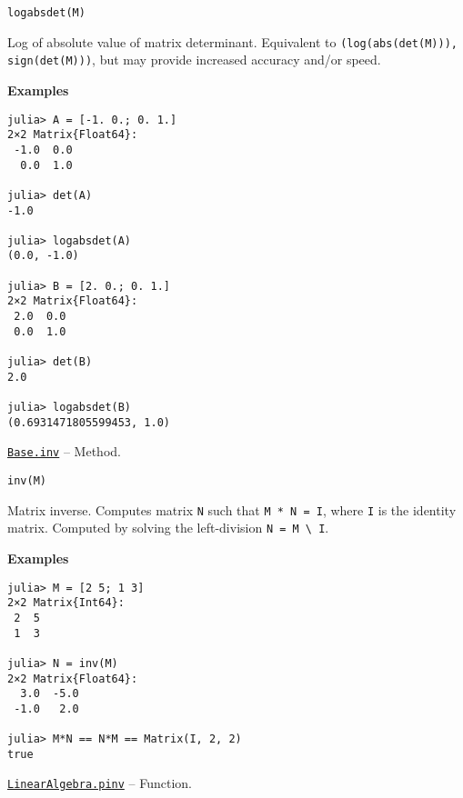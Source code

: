 \begin{adjustwidth}{2em}{0pt}


\begin{verbatim}
logabsdet(M)
\end{verbatim}

Log of absolute value of matrix determinant. Equivalent to \texttt{(log(abs(det(M))), sign(det(M)))}, but may provide increased accuracy and/or speed.

\textbf{Examples}


\begin{verbatim}
julia> A = [-1. 0.; 0. 1.]
2×2 Matrix{Float64}:
 -1.0  0.0
  0.0  1.0

julia> det(A)
-1.0

julia> logabsdet(A)
(0.0, -1.0)

julia> B = [2. 0.; 0. 1.]
2×2 Matrix{Float64}:
 2.0  0.0
 0.0  1.0

julia> det(B)
2.0

julia> logabsdet(B)
(0.6931471805599453, 1.0)
\end{verbatim}



\end{adjustwidth}
\hypertarget{12694757096239235470}{}
\hyperlink{12694757096239235470}{\texttt{Base.inv}}  -- {Method.}

\begin{adjustwidth}{2em}{0pt}


\begin{verbatim}
inv(M)
\end{verbatim}

Matrix inverse. Computes matrix \texttt{N} such that \texttt{M * N = I}, where \texttt{I} is the identity matrix. Computed by solving the left-division \texttt{N = M {\textbackslash} I}.

\textbf{Examples}


\begin{verbatim}
julia> M = [2 5; 1 3]
2×2 Matrix{Int64}:
 2  5
 1  3

julia> N = inv(M)
2×2 Matrix{Float64}:
  3.0  -5.0
 -1.0   2.0

julia> M*N == N*M == Matrix(I, 2, 2)
true
\end{verbatim}



\end{adjustwidth}
\hypertarget{15549768004641518126}{}
\hyperlink{15549768004641518126}{\texttt{LinearAlgebra.pinv}}  -- {Function.}

